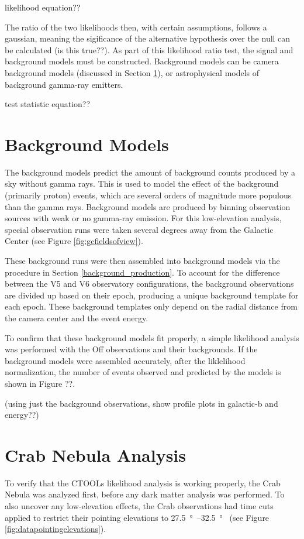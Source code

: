   {\color{red}likelihood equation??}
  
  The ratio of the two likelihoods then, with certain assumptions, follows a gaussian, meaning the sigificance of the alternative hypothesis over the null can be calculated {\color{red}(is this true??)}.
  As part of this likelihood ratio test, the signal and background models must be constructed.
  Background models can be camera background models (discussed in Section \ref{sec:bkgmodels}), or astrophysical models of background gamma-ray emitters.

  {\color{red}test statistic equation??}

\section{Background Models}\label{sec:bkgmodels}
  The background models predict the amount of background counts produced by a sky without gamma rays.
  This is used to model the effect of the background (primarily proton) events, which are several orders of magnitude more populous than the gamma rays.
  Background models are produced by binning observation sources with weak or no gamma-ray emission.
  For this low-elevation analysis, special observation runs were taken several degrees away from the Galactic Center (see Figure \ref{fig:gcfieldsofview}).

  These background runs were then assembled into background models via the procedure in Section \ref{background_production}.
  To account for the difference between the V5 and V6 observatory configurations, the background observations are divided up based on their epoch, producing a unique background template for each epoch.
  These background templates only depend on the radial distance from the camera center and the event energy.

  To confirm that these background models fit properly, a simple likelihood analysis was performed with the Off observations and their backgrounds.
  If the background models were assembled accurately, after the liklelihood normalization, the number of events observed and predicted by the models is shown in {\color{red}Figure ??}.

  {\color{red}(using just the background observations, show profile plots in galactic-b and energy??)}

\section{Crab Nebula Analysis}\label{sec:crab_analysis}
  To verify that the CTOOLs likelihood analysis is working properly, the Crab Nebula was analyzed first, before any dark matter analysis was performed.
  To also uncover any low-elevation effects, the Crab observations had time cuts applied to restrict their pointing elevations to \SIrange{27.5}{32.5}{\degree{}} (see Figure \ref{fig:datapointingelevations}).

